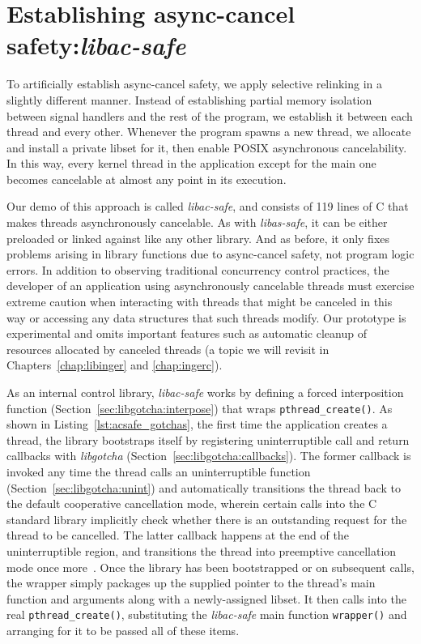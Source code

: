 


\section{Establishing async-cancel safety:\@ \textit{libac-safe}}

To artificially establish async-cancel safety, we apply selective relinking in a
slightly different manner.  Instead of establishing partial memory isolation between
signal handlers and the rest of the program, we establish it between each thread and
every other.  Whenever the program spawns a new thread, we allocate and install a
private libset for it, then enable POSIX asynchronous cancelability.  In this way,
every kernel thread in the application except for the main one becomes cancelable at
almost any point in its execution.

Our demo of this approach is called \textit{libac-safe}, and consists of 119 lines of
C that makes threads asynchronously cancelable.  As with \textit{libas-safe}, it can
be either preloaded or linked against like any other library.  And as before, it only
fixes problems arising in library functions due to async-cancel safety, not program
logic errors.  In addition to observing traditional concurrency control practices,
the developer of an application using asynchronously cancelable threads must exercise
extreme caution when interacting with threads that might be canceled in this way or
accessing any data structures that such threads modify.  Our prototype is
experimental and omits important features such as automatic cleanup of resources
allocated by canceled threads (a topic we will revisit in
Chapters~\ref{chap:libinger} and \ref{chap:ingerc}).

As an internal control library, \textit{libac-safe} works by defining a forced
interposition function (Section~\ref{sec:libgotcha:interpose}) that wraps
\texttt{pthread\_create()}.  As shown in Listing~\ref{lst:acsafe_gotchas}, the first
time the application creates a thread, the library bootstraps itself by registering
uninterruptible call and return callbacks with \textit{libgotcha}
(Section~\ref{sec:libgotcha:callbacks}).  The former callback is invoked any time the
thread calls an uninterruptible function (Section~\ref{sec:libgotcha:unint}) and
automatically transitions the thread back to the default cooperative cancellation
mode, wherein certain calls into the C standard library implicitly check whether
there is an outstanding request for the thread to be cancelled.  The latter callback
happens at the end of the uninterruptible region, and transitions the thread into
preemptive cancellation mode once more~\cite{pthreadsetcanceltype-manpage}.  Once the
library has been bootstrapped or on subsequent calls, the wrapper simply packages up
the supplied pointer to the thread's main function and arguments along with a
newly-assigned libset.  It then calls into the real \texttt{pthread\_create()},
substituting the \textit{libac-safe} main function \texttt{wrapper()} and arranging
for it to be passed all of these items.

